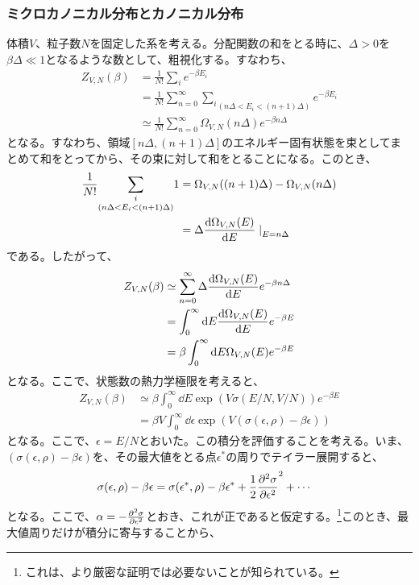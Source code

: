 \documentclass[a4paper,11pt]{jsarticle}
\numberwithin{equation}{section}
\begin{document}
\subsubsection{ミクロカノニカル分布とカノニカル分布}
体積$V$、粒子数$N$を固定した系を考える。分配関数の和をとる時に、$\Delta > 0$を$\beta \Delta \ll 1$となるような数として、粗視化する。すなわち、
\begin{align}
  Z_{V,N}(\beta) &= \frac{1}{N!}\sum_{i}e^{-\beta E_{i}}\\
  &= \frac{1}{N!}\sum_{n=0}^{\infty}\underset{(n\Delta < E_i < (n+1)\Delta)}{\sum_{i}}e^{-\beta E_{i}}\\
  &\simeq \frac{1}{N!}\sum_{n=0}^{\infty}\Omega_{V,N}(n\Delta)e^{-\beta n\Delta}
\end{align}
となる。すなわち、領域$[n\Delta,(n+1)\Delta]$のエネルギー固有状態を束としてまとめて和をとってから、その束に対して和をとることになる。このとき、
\begin{align}
  \frac{1}{N!}\underset{(n\Delta < E_i < (n+1)\Delta)}{\sum_{i}} 1 &= \Omega_{V,N}((n+1)\Delta) - \Omega_{V,N}(n\Delta)\\
  &= \Delta \dv{\Omega_{V,N}(E)}{E}\left.\right|_{E=n\Delta}
\end{align}
である。したがって、
\begin{align}
  Z_{V,N}(\beta) &\simeq \sum_{n=0}^{\infty}\Delta\dv{\Omega_{V,N}(E)}{E}e^{-\beta n\Delta}\\
  &= \int_{0}^{\infty}\dd E \dv{\Omega_{V,N}(E)}{E}e^{-\beta E} \label{eq:canlap}\\
  &= \beta \int_{0}^{\infty}\dd E \Omega_{V,N}(E)e^{-\beta E}
\end{align}
となる。ここで、状態数の熱力学極限を考えると、
\begin{align}
  Z_{V,N}(\beta) &\simeq \beta \int_{0}^{\infty}\dd E \exp(V\sigma(E/N,V/N))e^{-\beta E}\\
  &= \beta V \int_{0}^{\infty}\dd \epsilon \exp(V(\sigma(\epsilon,\rho)-\beta \epsilon))
\end{align}
となる。ここで、$\epsilon = E/N$とおいた。この積分を評価することを考える。いま、$(\sigma(\epsilon,\rho)-\beta \epsilon)$を、その最大値をとる点$\epsilon^{*}$の周りでテイラー展開すると、
\begin{align}
  \sigma(\epsilon,\rho)-\beta \epsilon &= \sigma(\epsilon^{*},\rho)-\beta \epsilon^{*} + \frac{1}{2}\pdv[2]{\sigma}{\epsilon}(\epsilon-\epsilon^{*})^2 + \cdots
\end{align}
となる。ここで、$\alpha = -\pdv[2]{\sigma}{\epsilon}$とおき、これが正であると仮定する。\footnote{これは、より厳密な証明では必要ないことが知られている。}このとき、最大値周りだけが積分に寄与することから、
\end{document}
